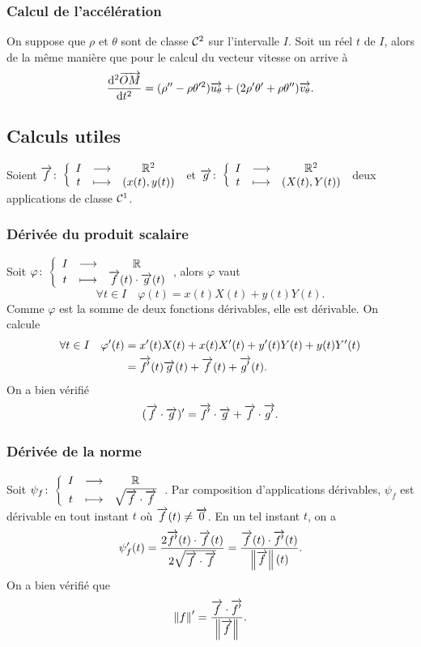 \subsubsection{Calcul de l'accélération}
On suppose que \(\rho\) et \(\theta\) sont de classe \(\mathcal{C}^{2}\) sur l'intervalle \(I\). Soit un réel \(t\) de \(I\), alors de la même manière que pour le calcul du vecteur vitesse on arrive à
\begin{equation}
  \dfrac{\mathrm{d}^2 \overrightarrow{OM}}{\mathrm{d} {t}^2}=(\rho''-\rho\theta'^2)\overrightarrow{u_\theta} + (2\rho'\theta'+\rho\theta'')\overrightarrow{v_\theta}.
\end{equation}

\subsection{Calculs utiles}
Soient \(\overrightarrow{f}\colon \left\{\begin{array}{ccc} I & \longrightarrow &\mathbb{R}^2\\ t & \longmapsto & (x(t),y(t)) \end{array} \right.\) et \(\overrightarrow{g}\colon \left\{\begin{array}{ccc} I & \longrightarrow &\mathbb{R}^2\\ t & \longmapsto & (X(t),Y(t)) \end{array} \right.\) deux applications de classe \(\mathcal{C}^{1}\).

\subsubsection{Dérivée du produit scalaire}
Soit \(\varphi\colon \left\{\begin{array}{ccc} I & \longrightarrow &\mathbb{R}\\ t & \longmapsto & \overrightarrow{f}(t) \cdot \overrightarrow{g}(t) \end{array} \right.\), alors \(\varphi\) vaut
\begin{equation}
  \forall t \in I \quad \varphi(t)=x(t)X(t)+y(t)Y(t).
\end{equation}
Comme \(\varphi\) est la somme de deux fonctions dérivables, elle est dérivable. On calcule
\begin{align}
  \forall t \in I \quad \varphi'(t)&=x'(t)X(t)+x(t)X'(t)+y'(t)Y(t)+y(t)Y'(t)\\
  &=\overrightarrow{f'}(t)\overrightarrow{g}(t)+\overrightarrow{f}(t)+\overrightarrow{g'}(t).
\end{align}
On a bien vérifié
\begin{equation}
  (\overrightarrow{f} \cdot \overrightarrow{g})'=\overrightarrow{f'} \cdot \overrightarrow{g} + \overrightarrow{f} \cdot \overrightarrow{g'}.
\end{equation}

\subsubsection{Dérivée de la norme}
Soit \(\psi_f\colon \left\{\begin{array}{ccc} I & \longrightarrow &\mathbb{R}\\ t & \longmapsto & \sqrt{\overrightarrow{f} \cdot \overrightarrow{f}} \end{array} \right.\). Par composition d'applications dérivables, \(\psi_f\) est dérivable en tout instant \(t\) où \(\overrightarrow{f}(t) \neq \overrightarrow{0}\). En un tel instant \(t\), on a
\begin{equation}
  \psi_f'(t)=\frac{2 \overrightarrow{f'}(t)\cdot\overrightarrow{f}(t)}{2 \sqrt{\overrightarrow{f} \cdot \overrightarrow{f}}}=\frac{\overrightarrow{f}(t)\cdot\overrightarrow{f'}(t)}{\left\lVert\overrightarrow{f}\right\rVert(t)}.
\end{equation}
On a bien vérifié que
\begin{equation}
 \left\lVert f\right\rVert'=\frac{\overrightarrow{f} \cdot \overrightarrow{f'}}{\left\lVert\overrightarrow{f}\right\rVert}.
\end{equation}

